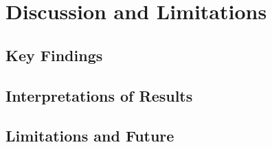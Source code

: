 \section{Discussion and Limitations}

\subsection{Key Findings}

\subsection{Interpretations of Results}

\subsection{Limitations and Future}
